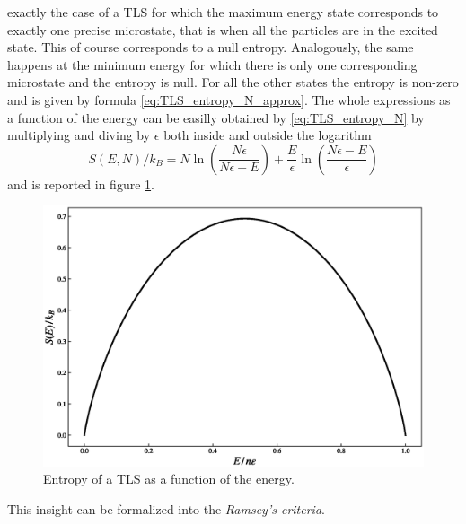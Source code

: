 exactly the case of a TLS for which the maximum energy state corresponds to exactly one precise microstate, that is when all the particles are in the excited state. This of course corresponds to a null entropy. Analogously, the same happens at the minimum energy for which there is only 
one corresponding microstate and the entropy is null. For all the other states the entropy is non-zero and is given by formula \ref{eq:TLS_entropy_N_approx}. The whole expressions as a function of the energy can be easilly obtained by \ref{eq:TLS_entropy_N} by multiplying and diving by $\epsilon$ both inside and outside the logarithm
\begin{equation}
    S(E, N) / k_B = N \ln\left(\frac{N\epsilon}{N\epsilon - E}\right) + \frac{E}{\epsilon} \ln\left(\frac{N\epsilon - E}{\epsilon}\right)
    \label{eq:entropy_E_TLS}
\end{equation}
and is reported in figure \ref{fig:TLS_entropy_E}. \\
\begin{figure}[h]
    \centering 
    \includegraphics[scale=0.65]{images/entropy_TLS.eps}
    \caption{Entropy of a TLS as a function of the energy.}
    \label{fig:TLS_entropy_E}
\end{figure}
This insight can be formalized into the \emph{Ramsey's criteria}.
\newpage
